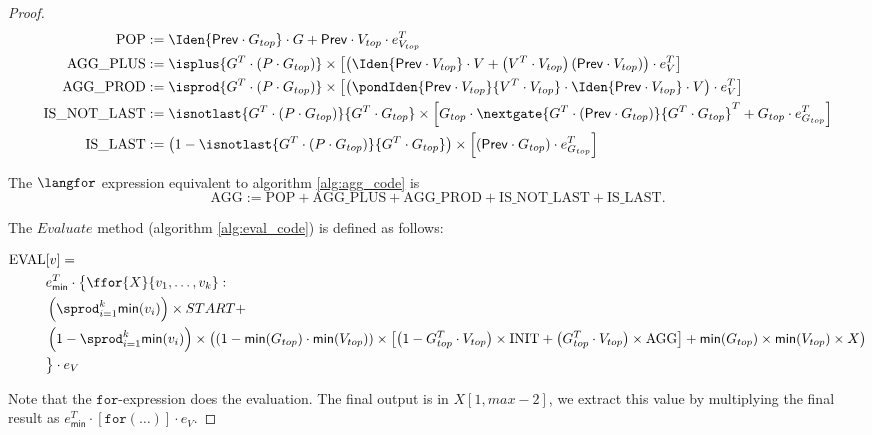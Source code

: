 \begin{proof}
\begin{align*}
	\text{POP} &:= \Iden{\mathsf{Prev}\cdot G_{top}}\cdot G + \mathsf{Prev}\cdot V_{top}\cdot e_{V_{top}}^T  \\
	\text{AGG{\_}PLUS} &:= \isplus{G^T \cdot \left( P \cdot G_{top}\right)} \times \left[ \left( \Iden{\mathsf{Prev}\cdot V_{top}} \cdot V + \left( V^T \cdot V_{top} \right)\left( \mathsf{Prev}\cdot V_{top} \right)\right) \cdot e_{V}^T \right] \\
	\text{AGG{\_}PROD} &:= \isprod{G^T \cdot \left( P \cdot G_{top}\right)} \times \left[ \left( \pondIden{\mathsf{Prev}\cdot V_{top}}{V^T \cdot V_{top}} \cdot \Iden{\mathsf{Prev}\cdot V_{top}} \cdot V \right) \cdot e_{V}^T \right] \\
	\text{IS{\_}NOT{\_}LAST} &:= \isnotlast{G^T \cdot \left( P \cdot G_{top}\right)}{G^T \cdot G_{top}} \times \left[  G_{top} \cdot \nextgate{G^T \cdot \left( \mathsf{Prev}\cdot G_{top} \right) }{G^T \cdot G_{top}}^T + G_{top}\cdot e_{G_{top}}^T \right] \\
	\text{IS{\_}LAST} &:= \left( 1 - \isnotlast{G^T \cdot \left( P \cdot G_{top}\right)}{G^T \cdot G_{top}} \right)\times \left[ \left( \mathsf{Prev}\cdot G_{top} \right) \cdot e_{G_{top}}^T \right]
\end{align*}

The $\langfor$ expression equivalent to algorithm \ref{alg:agg_code} is $$\text{AGG}:=\text{POP} + \text{AGG{\_}PLUS}+\text{AGG{\_}PROD}+\text{IS{\_}NOT{\_}LAST}+\text{IS{\_}LAST}.$$

The $Evaluate$ method (algorithm \ref{alg:eval_code}) is defined as follows:

\begin{align*}
	\text{EVAL}&[v]= \\
	&e_{\mathsf{min}}^T \cdot \big\lbrace \ffor{X}{v_1, \ldots, v_k}: \\
	&\left( \sprod_{i=1}^k \mathsf{min}(v_i)\right) \times START + \\
	&\left( 1- \sprod_{i=1}^k \mathsf{min}(v_i)\right) \times \left( \left(1 - \mathsf{min}(G_{top})\cdot \mathsf{min}(V_{top}) \right) \times \left[ \left( 1 - G_{top}^T\cdot V_{top} \right) \times \text{INIT} + \left(  G_{top}^T\cdot V_{top} \right) \times \text{AGG} \right] + \mathsf{min}(G_{top})\times \mathsf{min}(V_{top})\times X\right) \\ 
	&\big\rbrace\cdot e_{V}
\end{align*}

Note that the $ \texttt{for}$-expression does the evaluation. The final output is in $X[1,max-2]$, we extract this value by multiplying the final result as $e_{\mathsf{min}}^T\cdot [\texttt{for}(\ldots )]\cdot e_{V}$.


\end{proof}
